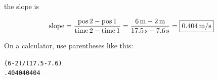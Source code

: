 \documentclass[../main-physics-problems.tex]{subfiles}
\begin{document}
\begin{questions}
\begin{parts}
\begin{solution}
    the slope is

    \begin{equation*}
        \text{slope} = \frac{\text{pos\,2} - \text{pos\,1}}{\text{time\,2} - \text{time\,1}} 
        = \frac{\SI{6}{m} - \SI{2}{m}}{\SI{17.5}{s} - \SI{7.6}{s}} = \boxed{\SI{0.404}{m/s}}
    \end{equation*}

    \bigskip

    On a calculator, use parentheses like this:

    \medskip

    \begin{center}
        \texttt{(6-2)/(17.5-7.6)}\\
        \hspace{2.5em} \texttt{.404040404}
    \end{center}
\end{solution}

\end{parts}




\end{questions}
\end{document}
